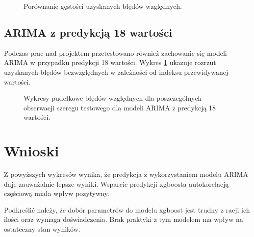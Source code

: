 \documentclass[11pt]{report}
\begin{document}
\begin{figure}[H]
    \centering
    \centering
    \def\svgwidth{10cm}
    
    \caption{Porównanie gęstości uzyskanych błędów względnych.}
\end{figure}

\subsection{ARIMA z predykcją 18 wartości}
Podczas prac nad projektem przetestowano również zachowanie się modeli ARIMA w przypadku predykcji 18 wartości.
Wykres \ref{fig:arima18} ukazuje rozrzut uzyskanych błędów bezwzględnych w zależności od indeksu przewidywanej wartości.

\begin{figure}[H]
    \centering
    \centering
    \def\svgwidth{10cm}
    
     \caption{Wykresy pudełkowe błędów względnych dla poszczególnych obserwacji szeregu testowego dla modeli ARIMA z predykcją 18 wartości.}
    \label{fig:arima18}
\end{figure}

\section{Wnioski}
Z powyższych wykresów wynika, że predykcja z wykorzystaniem modelu ARIMA daje zauważalnie lepsze wyniki.
Wsparcie predykcji xgboosta autokorelacją częściową miała wpływ pozytywny.

Podkreślić należy, że dobór parametrów do modelu xgboost jest trudny z racji ich ilości oraz wymaga doświadczenia.
Brak praktyki z tym modelem ma wpływ na ostateczny stan wyników.




\end{document}
